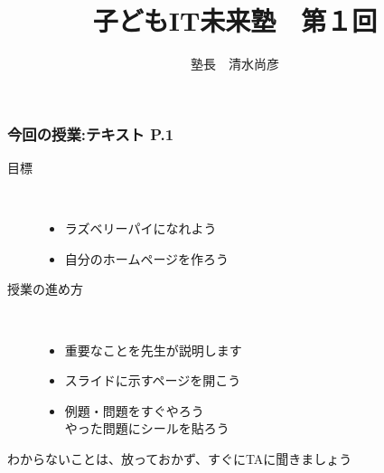 \documentclass[dvipdfmx]{beamer}
\title{子どもIT未来塾　第１回}
\author{塾長　清水尚彦}
\begin{document}



\begin{frame}[fragile]
	\frametitle{今回の授業:テキスト P.1~~~}
		\begin{description}
			\item[目標] ~\\
				\begin{itemize}
					\item ラズベリーパイになれよう
					\item 自分のホームページを作ろう
				\end{itemize}

			\item[授業の進め方]~\\
				\begin{itemize}
					\item 重要なことを先生が説明します
					\item スライドに示すページを開こう
					\item 例題・問題をすぐやろう\\
						やった問題にシールを貼ろう
				\end{itemize}
		\end{description}
		\vfill
		わからないことは、放っておかず、すぐにTAに聞きましょう
\end{frame}
\end{document}
